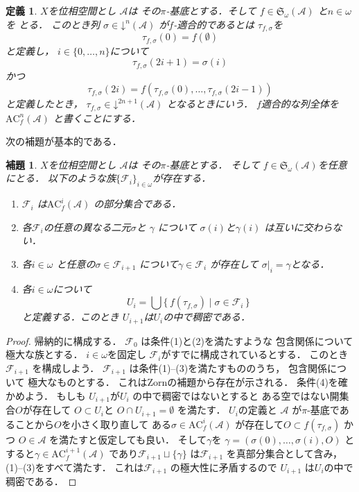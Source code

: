 \documentclass[leqno, 12pt]{jsarticle}
\newtheorem{lem}[thm]{補題}
\newtheorem{df}[thm]{定義}
\newcommand{\mycal}[1]{\mathcal{#1}}
\newcommand{\mydn}[2]{\mathord{\downarrow}^{#1}(#2)}
\newcommand{\mysen}[2]{\mathfrak{S}_{#1}(#2)}
\newcommand{\myac}[3]{\mathrm{AC}_{#1}^{#3}(#2)}
\newcommand{\myom}{\omega}
\begin{document}
\begin{df}
$X$を位相空間とし
$\mycal{A}$は
その$\pi$-基底とする．そして
$f\in 
\mysen{\myom}{\mycal{A}}$
と$n\in \myom$
を
とる．
このとき列
$\sigma\in \mydn{n}{\mycal{A}}$
が$f$-適合的であるとは
$\tau_{f, \sigma}$を
\[
\tau_{f, \sigma}(0)=f(\emptyset)
\]
と定義し，
$i\in\{0, \dots, n\}$について
\[
\tau_{f, \sigma}(2i+1)=\sigma(i)
\]
かつ
\[
\tau_{f, \sigma}(2i)=f(\tau_{f, \sigma}(0), \dots, \tau_{f, \sigma}(2i-1))
\]
と定義したとき，
$\tau_{f, \sigma}\in \mydn{2n+1}{\mycal{A}}$
となるときにいう．
$f$適合的な列全体を
$\myac{f}{\mycal{A}}{n}$
と書くことにする．
\end{df}

次の補題が基本的である．
\begin{lem}\label{lem:dense}
$X$を位相空間とし
$\mycal{A}$は
その$\pi$-基底とする．
そして
$f\in 
\mysen{\myom}{\mycal{A}}$を任意にとる．
以下のような族$\{\mycal{F}_{i}\}_{i\in \myom}$が存在する．
\begin{enumerate}
\item 
$\mycal{F}_{i}$
は$\myac{f}{\mycal{A}}{i}$
の部分集合である．
\item 
各$\mycal{F}_{i}$の任意の異なる二元$\sigma$と
$\gamma$
について
$\sigma(i)$と$\gamma(i)$
は互いに交わらない．

\item 
各$i\in \myom$
と任意の$\sigma\in \mycal{F}_{i+1}$
について$\gamma\in \mycal{F}_{i}$
が存在して
$\sigma|_{i}=\gamma$となる．

\item 
各$i\in \myom$について
\[
U_{i}=\bigcup\{\, f(\tau_{f, \sigma})\mid \sigma
\in \mycal{F}_{i}
\, \}
\]
と定義する．このとき
$U_{i+1}$は$U_{i}$の中で稠密である．

\end{enumerate}
\end{lem}
\begin{proof}
帰納的に構成する．
$\mathcal{F}_{0}$
は条件(1)と(2)を満たすような
包含関係について極大な族とする．
$i\in \myom$を固定し
$\mycal{F}_{i}$がすでに構成されているとする．
このとき$\mycal{F}_{i+1}$
を構成しよう．
$\mathcal{F}_{i+1}$
は条件(1)--(3)を満たすもののうち，
包含関係について
極大なものとする．
これはZornの補題から存在が示される．
条件(4)を確かめよう．
もしも
$U_{i+1}$が$U_{i}$
の中で稠密ではないとすると
ある空ではない開集合$O$が存在して
$O\subset U_{i}$と
$O\cap U_{i+1}=\emptyset$
を満たす．
$U_{i}$の定義と
$\mathcal{A}$
が$\pi$-基底であることから$O$を小さく取り直して
ある$\sigma\in \myac{f}{\mycal{A}}{i}$
が存在して$O\subset f(\tau_{f, \sigma})$
かつ
$O\in \mathcal{A}$
を満たすと仮定しても良い．
そして$\gamma$を
$\gamma=(\sigma(0), \dots, \sigma(i), O)$
とすると$\gamma\in \myac{f}{\mycal{A}}{i+1}$
であり$\mycal{F}_{i+1}\sqcup\{\gamma\}$
は$\mycal{F}_{i+1}$
を真部分集合として含み，
(1)--(3)をすべて満たす．
これは$\mycal{F}_{i+1}$
の極大性に矛盾するので
$U_{i+1}$
は$U_{i}$の中で稠密である．
\end{proof}
\end{document}
